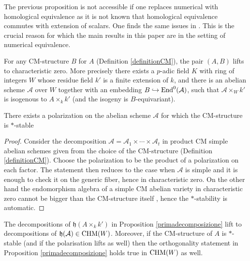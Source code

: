 \documentclass[11pt]{amsart}
\begin{document}
\begin{remark} The previous proposition is not accessible if one replaces numerical with homological equivalence as it is not known that homological equivalence commutes with extension of scalars. One finds the same issues in \cite{Clozel}. This is the crucial reason for which the main results in this paper are in the setting of numerical equivalence.
\end{remark}
\begin{theorem}\label{HondaTate}
 For any CM-structure $B$ for $A$ (Definition \ref{definitionCM}), the pair  $(A,B)$ lifts to characteristic zero. More precisely there exists a $p$-adic field $K$ with ring of integers $W$ whose residue field $k'$ is a finite extension of $k$, and there is an abelian scheme $\mathcal{A}$ over $W$ together with an embedding $B\hookrightarrow \textnormal{End}^0(\mathcal{A})$, such that $\mathcal{A}\times_W k'$ is isogenous to $A \times_k k'$ (and the isogeny is $B$-equivariant).
 \end{theorem}

\begin{corollary}\label{CMstab}
There exists a polarization on the abelian scheme $\mathcal{A}$ for which the CM-structure is $*$-stable
\end{corollary}
\begin{proof}
Consider the decomposition $\mathcal{A}= \mathcal{A}_1\times \cdots \times \mathcal{A}_t  $ in product  CM simple abelian schemes given from the choice of the CM-structure (Definition \ref{definitionCM}). Choose the polarization to be the product of a polarization on each factor. The statement then reduces to the case when $\mathcal{A}$ is simple and it is enough to check it on the generic fiber, hence in characteristic zero. On the other hand the endomorphism algebra of a simple CM abelian variety in characteristic zero cannot be bigger than the CM-structure itself \cite[\S 22]{MumfordTata}, hence the $*$-stability is automatic. 
\end{proof}


\begin{corollary}\label{lifting motives}
The decompositions of $\mathfrak{h}(A \times_k k')$ in Proposition \ref{primadecomposizione}  lift to decompositions of $\mathfrak{h}(\mathcal{A})\in  \mathrm{CHM} (W)$. Moreover, if the CM-structure of $A$ is $*$-stable (and if the polarisation lifts as well) then the orthogonality statement in Proposition \ref{primadecomposizione} holds true in $ \mathrm{CHM} (W)$ as well.
\end{corollary}
\end{document}
